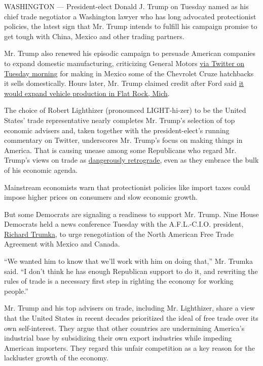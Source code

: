 WASHINGTON --- President-elect Donald J. Trump on Tuesday named as his
chief trade negotiator a Washington lawyer who has long advocated
protectionist policies, the latest sign that Mr. Trump intends to
fulfill his campaign promise to get tough with China, Mexico and other
trading partners.

Mr. Trump also renewed his episodic campaign to persuade American
companies to expand domestic manufacturing, criticizing General Motors
\href{https://twitter.com/realDonaldTrump/status/816260343391514624}{via
Twitter on Tuesday morning} for making in Mexico some of the Chevrolet
Cruze hatchbacks it sells domestically. Hours later, Mr. Trump claimed
credit after Ford said
\href{http://www.nytimes3xbfgragh.onion/2017/01/03/business/ford-general-motors-trump.html?hp\&action=click\&pgtype=Homepage\&clickSource=story-heading\&module=first-column-region\&region=top-news\&WT.nav=top-news}{it
would expand vehicle production in Flat Rock, Mich}.

The choice of Robert Lighthizer (pronounced LIGHT-hi-zer) to be the
United States' trade representative nearly completes Mr. Trump's
selection of top economic advisers and, taken together with the
president-elect's running commentary on Twitter, underscores Mr. Trump's
focus on making things in America. That is causing unease among some
Republicans who regard Mr. Trump's views on trade as
\href{http://www.nytimes3xbfgragh.onion/2016/03/11/us/politics/-trade-donald-trump-breaks-200-years-economic-orthodoxy-mercantilism.html}{dangerously
retrograde}, even as they embrace the bulk of his economic agenda.

Mainstream economists warn that protectionist policies like import taxes
could impose higher prices on consumers and slow economic growth.

But some Democrats are signaling a readiness to support Mr. Trump. Nine
House Democrats held a news conference Tuesday with the A.F.L.-C.I.O.
president,
\href{https://www.nytimes3xbfgragh.onion/2016/12/27/opinion/dont-let-trump-speak-for-workers.html?_r=0}{Richard
Trumka}, to urge renegotiation of the North American Free Trade
Agreement with Mexico and Canada.

``We wanted him to know that we'll work with him on doing that,'' Mr.
Trumka said. ``I don't think he has enough Republican support to do it,
and rewriting the rules of trade is a necessary first step in righting
the economy for working people.''

Mr. Trump and his top advisers on trade, including Mr. Lighthizer, share
a view that the United States in recent decades prioritized the ideal of
free trade over its own self-interest. They argue that other countries
are undermining America's industrial base by subsidizing their own
export industries while impeding American importers. They regard this
unfair competition as a key reason for the lackluster growth of the
economy.

